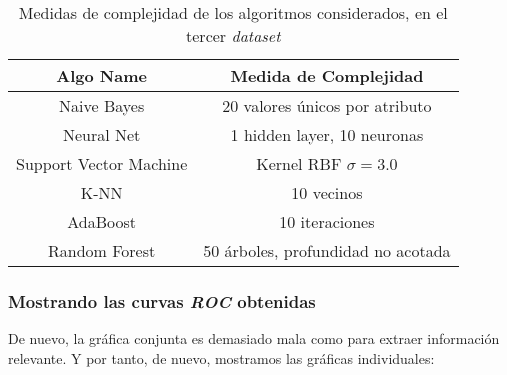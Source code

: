\documentclass[11pt]{article}
\begin{document}
\begin{table}[H]
\begin{center}
    \begin{tabular}{|c|c|}
        \hline
        Algo Name & Medida de Complejidad \\
        \hline
        Naive Bayes& 20 valores únicos por atributo \\
        Neural Net & 1 hidden layer, 10 neuronas \\
        Support Vector Machine& Kernel RBF $\sigma = 3.0$ \\
        K-NN& 10 vecinos \\
        AdaBoost& 10 iteraciones \\
        Random Forest& 50 árboles, profundidad no acotada \\
        \hline
    \end{tabular}
\end{center}
    \caption{Medidas de complejidad de los algoritmos considerados, en el tercer \emph{dataset}}
\end{table}

\pagebreak

\subsubsection{Mostrando las curvas \emph{ROC} obtenidas}

De nuevo, la gráfica conjunta es demasiado mala como para extraer información relevante. Y por tanto, de nuevo, mostramos las gráficas individuales:
\end{document}

